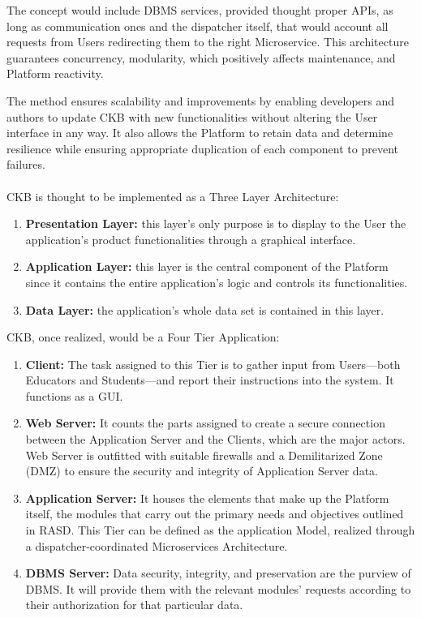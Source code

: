 The concept would include DBMS services, provided thought proper APIs, as long as communication ones and the dispatcher itself, that would account all requests from Users redirecting them to the right Microservice. This architecture guarantees concurrency, modularity, which positively affects maintenance, and Platform reactivity.

The method ensures scalability and improvements by enabling developers and authors to update CKB with new functionalities without altering the User interface in any way. 
It also allows the Platform to retain data and determine resilience while ensuring appropriate duplication of each component to prevent failures.\\
\\
CKB is thought to be implemented as a Three Layer Architecture:
\begin{enumerate}[label=$\bullet$]
    \item \textbf{Presentation Layer:} this layer's only purpose is to display to the User the application's product functionalities through a graphical interface.
    \item \textbf{Application Layer:} this layer is the central component of the Platform since it contains the entire application's logic and controls its functionalities.
    \item \textbf{Data Layer:} the application's whole data set is contained in this layer.
\end{enumerate}
CKB, once realized, would be a Four Tier Application:
\begin{enumerate}
    \item \textbf{Client:} The task assigned to this Tier is to gather input from Users—both Educators and Students—and report their instructions into the system. It functions as a GUI.
    \item \textbf{Web Server:} It counts the parts assigned to create a secure connection between the Application Server and the Clients, which are the major actors. Web Server is outfitted with 
    suitable firewalls and a Demilitarized Zone (DMZ) to ensure the security and integrity of Application Server data.
    \item \textbf{Application Server:} It houses the elements that make up the Platform itself, the modules that carry out the primary needs and objectives outlined in RASD. This Tier can be 
    defined as the application Model, realized through a dispatcher-coordinated Microservices Architecture.
    \item \textbf{DBMS Server:} Data security, integrity, and preservation are the purview of DBMS. It will provide them with the relevant modules' requests according to their authorization for that particular data. 
\end{enumerate}
\newpage

